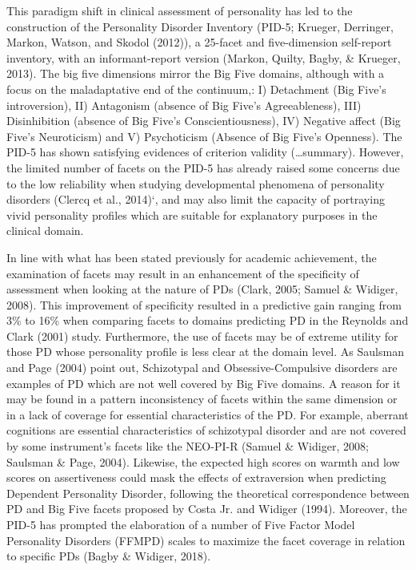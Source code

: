 \documentclass[man]{apa6}
\theoremstyle{definition}
\theoremstyle{definition}
\theoremstyle{definition}
\theoremstyle{remark}
\begin{document}
This paradigm shift in clinical assessment of personality has led to the
construction of the Personality Disorder Inventory (PID-5; Krueger,
Derringer, Markon, Watson, and Skodol (2012)), a 25-facet and
five-dimension self-report inventory, with an informant-report version
(Markon, Quilty, Bagby, \& Krueger, 2013). The big five dimensions
mirror the Big Five domains, although with a focus on the maladaptative
end of the continuum,: I) Detachment (Big Five's introversion), II)
Antagonism (absence of Big Five's Agreeableness), III) Disinhibition
(absence of Big Five's Conscientiousness), IV) Negative affect (Big
Five's Neuroticism) and V) Psychoticism (Absence of Big Five's
Openness). The PID-5 has shown satisfying evidences of criterion
validity (\ldots{}summary). However, the limited number of facets on the
PID-5 has already raised some concerns due to the low reliability when
studying developmental phenomena of personality disorders (Clercq et
al., 2014)`, and may also limit the capacity of portraying vivid
personality profiles which are suitable for explanatory purposes in the
clinical domain.

In line with what has been stated previously for academic achievement,
the examination of facets may result in an enhancement of the
specificity of assessment when looking at the nature of PDs (Clark,
2005; Samuel \& Widiger, 2008). This improvement of specificity resulted
in a predictive gain ranging from 3\% to 16\% when comparing facets to
domains predicting PD in the Reynolds and Clark (2001) study.
Furthermore, the use of facets may be of extreme utility for those PD
whose personality profile is less clear at the domain level. As Saulsman
and Page (2004) point out, Schizotypal and Obsessive-Compulsive
disorders are examples of PD which are not well covered by Big Five
domains. A reason for it may be found in a pattern inconsistency of
facets within the same dimension or in a lack of coverage for essential
characteristics of the PD. For example, aberrant cognitions are
essential characteristics of schizotypal disorder and are not covered by
some instrument's facets like the NEO-PI-R (Samuel \& Widiger, 2008;
Saulsman \& Page, 2004). Likewise, the expected high scores on warmth
and low scores on assertiveness could mask the effects of extraversion
when predicting Dependent Personality Disorder, following the
theoretical correspondence between PD and Big Five facets proposed by
Costa Jr. and Widiger (1994). Moreover, the PID-5 has prompted the
elaboration of a number of Five Factor Model Personality Disorders
(FFMPD) scales to maximize the facet coverage in relation to specific
PDs (Bagby \& Widiger, 2018).
\end{document}
